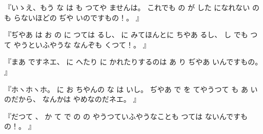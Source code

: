 『いゝえ、もう
な
は
も
つてや
ませんは。
これでも
の
が
した
になれない
の
も
らないほどの
ぢや
いのですもの！。
』

『ぢやあ
は
お
の
に
つては
るし、
に
みてほんとに
ちやあ
るし、
し
でも
つて
やうといふやうな
なんぞも
くつて！。
』

『まあ
ですネエ、
に
へたり
に
かれたりするのは
あ
り
ぢやあ
いんですもの。
』

『ホヽホヽホ。
に
お
ちやんの
な
は
いし。
ぢやあ
で
を
てやうつて
も
あ
いのだから、
なんかは
やめなのだネエ。
』

『だつて
、
か
て
で
の
の
やうつていふやうなことも
つては
ないんですもの！。
』

